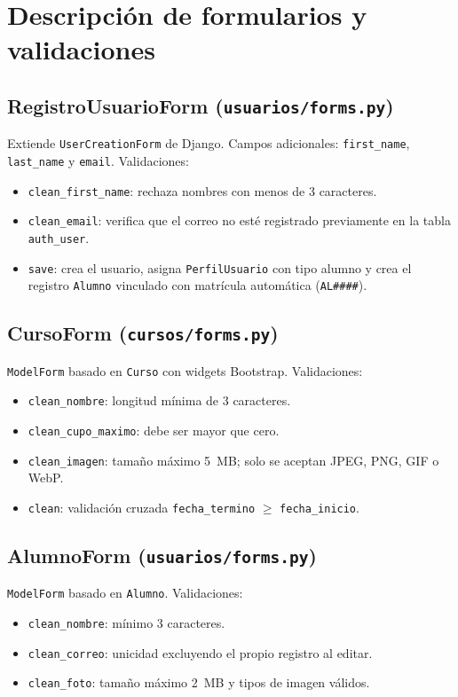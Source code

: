 \documentclass[11pt,letterpaper]{article}
\begin{document}
	\section{Descripci\'on de formularios y validaciones}
	
	\subsection{RegistroUsuarioForm (\texttt{usuarios/forms.py})}
	Extiende \texttt{UserCreationForm} de Django. Campos adicionales: \texttt{first\_name}, \texttt{last\_name} y \texttt{email}. Validaciones:
	\begin{itemize}[leftmargin=*]
		\item \texttt{clean\_first\_name}: rechaza nombres con menos de 3 caracteres.
		\item \texttt{clean\_email}: verifica que el correo no est\'e registrado previamente en la tabla \texttt{auth\_user}.
		\item \texttt{save}: crea el usuario, asigna \texttt{PerfilUsuario} con tipo alumno y crea el registro \texttt{Alumno} vinculado con matr\'icula autom\'atica (\texttt{AL\#\#\#\#}).
	\end{itemize}
	
	\subsection{CursoForm (\texttt{cursos/forms.py})}
	\texttt{ModelForm} basado en \texttt{Curso} con widgets Bootstrap. Validaciones:
	\begin{itemize}[leftmargin=*]
		\item \texttt{clean\_nombre}: longitud m\'inima de 3 caracteres.
		\item \texttt{clean\_cupo\_maximo}: debe ser mayor que cero.
		\item \texttt{clean\_imagen}: tama\~no m\'aximo 5~MB; solo se aceptan JPEG, PNG, GIF o WebP.
		\item \texttt{clean}: validaci\'on cruzada \texttt{fecha\_termino} $\geq$ \texttt{fecha\_inicio}.
	\end{itemize}
	
	\subsection{AlumnoForm (\texttt{usuarios/forms.py})}
	\texttt{ModelForm} basado en \texttt{Alumno}. Validaciones:
	\begin{itemize}[leftmargin=*]
		\item \texttt{clean\_nombre}: m\'inimo 3 caracteres.
		\item \texttt{clean\_correo}: unicidad excluyendo el propio registro al editar.
		\item \texttt{clean\_foto}: tama\~no m\'aximo 2~MB y tipos de imagen v\'alidos.
	\end{itemize}
	
\end{document}
